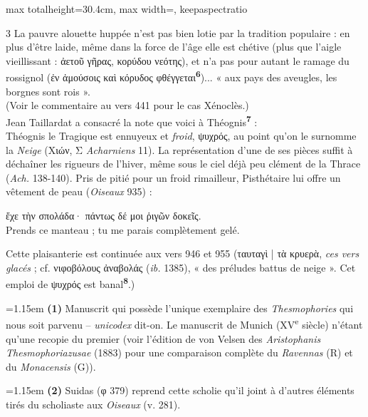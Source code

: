 \documentclass[11pt,twoside]{book}
\newcommand{\italique}[1]{\textit{#1}}
\newcommand{\citComm}[1]{\begin{quoting}[vskip=0.4pt,leftmargin=0.7em,rightmargin=0.2em]#1\end{quoting}}
\newcommand{\nieme}[1]{#1\textsuperscript{e}}
\newcommand{\francais}[1]{{\policeFr #1}}
\newcommand{\marqueur}[1]{\textsuperscript{\color{rubricRed}\textbf{#1}}}
\begin{document}
\begin{adjustbox}{max totalheight=30.4cm, max width=\textwidth, keepaspectratio}
\begin{minipage}{\textwidth}
{\begin{multicols}{3}
\noindent La pauvre alouette huppée n'est pas bien lotie par la tradition populaire : en plus d'être laide, même dans la force de l'âge elle est chétive (plus que l'aigle vieillissant : ἀετοῦ γῆρας, κορύδου νεότης), et n'a pas pour autant le ramage du rossignol (ἐν ἀμούσοις καὶ κόρυδος φθέγγεται\marqueur{6})... « aux pays des aveugles, les borgnes sont rois ».\\ (Voir le commentaire au vers 441 pour le cas Xénoclès.)\\ Jean Taillardat a consacré la note que voici à Théognis\marqueur{7} :\\ Théognis le Tragique est ennuyeux et \italique{froid}, ψυχρός, au point qu'on le surnomme la \italique{Neige} (Χιών, Σ \italique{Acharniens} 11). La représentation d'une de ses pièces suffit à déchaîner les rigueurs de l'hiver, même sous le ciel déjà peu clément de la Thrace (\italique{Ach.} 138-140). Pris de pitié pour un froid rimailleur, Pisthétaire lui offre un vêtement de peau (\italique{Oiseaux} 935) :
\citComm{ἔχε τὴν σπολάδα· πάντως δέ μοι ῥιγῶν δοκεῖς.\\
\francais{Prends ce manteau ; tu me parais complètement gelé.}}
\par\vspace{1.5pt}
\noindent Cette plaisanterie est continuée aux vers 946 et 955 (ταυταγὶ | τὰ κρυερὰ, \italique{ces vers glacés} ; cf. νιφοβόλους ἀναβολάς (\italique{ib.} 1385), « des préludes battus de neige ». Cet emploi de ψυχρός est banal\marqueur{8}.)
\par\vspace{1.5pt}
\par\vspace{1.2pt}\par\nopagebreak\vspace{1pt}\noindent\hangindent=1.15em {\color{sepiaNote}\textbf{(1)}} Manuscrit qui possède l'unique exemplaire des \italique{Thesmophories} qui nous soit parvenu -- \italique{unicodex} dit-on. Le manuscrit de Munich (\nieme{XV} siècle) n'étant qu'une recopie du premier (voir l'édition de von Velsen des \italique{Aristophanis Thesmophoriazusae} (1883) pour une comparaison complète du \italique{Ravennas} (R) et du \italique{Monacensis} (G)).
\par\vspace{1.5pt}
\noindent\hangindent=1.15em {\color{sepiaNote}\textbf{(2)}} Suidas (φ 379) reprend cette scholie qu'il joint à d'autres éléments tirés du scholiaste aux \italique{Oiseaux} (v. 281).

\end{multicols}}
\end{minipage}
\end{adjustbox}
\end{document}
